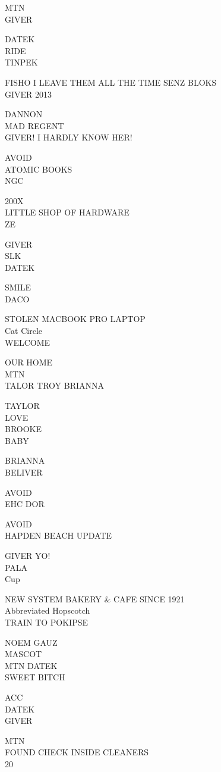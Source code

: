 \documentclass[10pt,letterpaper]{article}
\begin{document}
MTN\\
GIVER

DATEK\\
RIDE\\
TINPEK

FISHO I LEAVE THEM ALL THE TIME SENZ BLOKS\\
GIVER 2013

DANNON\\
MAD REGENT\\
GIVER!  I HARDLY KNOW HER!

AVOID\\
ATOMIC BOOKS\\
NGC

200X\\
LITTLE SHOP OF HARDWARE\\
ZE

GIVER\\
SLK\\
DATEK

SMILE\\
DACO

STOLEN MACBOOK PRO LAPTOP\\
Cat Circle\\
WELCOME

OUR HOME\\
MTN\\
TALOR TROY BRIANNA

TAYLOR\\
LOVE\\
BROOKE\\
BABY

BRIANNA\\
BELIVER

AVOID\\
EHC DOR

AVOID\\
HAPDEN BEACH UPDATE

GIVER YO!\\
PALA\\
Cup

NEW SYSTEM BAKERY \& CAFE SINCE 1921\\
Abbreviated Hopscotch\\
TRAIN TO POKIPSE

NOEM GAUZ\\
MASCOT\\
MTN DATEK\\
SWEET BITCH

ACC\\
DATEK\\
GIVER

MTN\\
FOUND CHECK INSIDE CLEANERS\\
20
\end{document}
